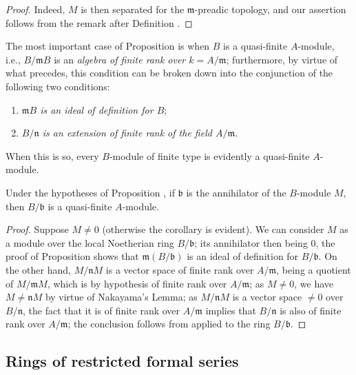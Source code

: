 \begin{proof}
Indeed, $M$ is then separated for the $\mathfrak{m}$-preadic topology, and our assertion
follows from the remark after Definition .
\end{proof}

\begin{env}[7.4.4]
\label{0.7.4.4}
The most important case of Proposition  is when $B$ is a
quasi-finite $A$-module, i.e., $B/\mathfrak{m}B$ is an \emph{algebra of finite rank over
$k=A/\mathfrak{m}$}; furthermore, by virtue of what precedes, this condition can be
broken down into the conjunction of the following two conditions:
\begin{enumerate}
  \item[(i)] \emph{$\mathfrak{m}B$ is an ideal of definition for $B$};
  \item[(ii)] \emph{$B/\mathfrak{n}$ is an extension of finite rank of the field $A/\mathfrak{m}$}.
\end{enumerate}
When this is so, every $B$-module of finite type is evidently a quasi-finite $A$-module.
\end{env}

\begin{corollary}[7.4.5]
\label{0.7.4.5}
Under the hypotheses of Proposition , if
$\mathfrak{b}$ is the annihilator of the $B$-module $M$, then $B/\mathfrak{b}$ is a
quasi-finite $A$-module.
\end{corollary}

\begin{proof}
Suppose $M\neq 0$ (otherwise the corollary is evident). We can consider $M$ as a
module over the local Noetherian ring $B/\mathfrak{b}$; its annihilator then being
$0$, the proof of Proposition  shows that
$\mathfrak{m}(B/\mathfrak{b})$ is an ideal of definition for $B/\mathfrak{b}$.
On the other hand, $M/\mathfrak{n}M$ is a vector space of finite rank over
$A/\mathfrak{m}$, being a quotient of $M/\mathfrak{m}M$, which is by hypothesis of
finite rank over $A/\mathfrak{m}$; as $M\neq 0$, we have $M\neq\mathfrak{n}M$ by
virtue of Nakayama's Lemma; as $M/\mathfrak{n}M$ is a vector space $\neq 0$ over
$B/\mathfrak{n}$, the fact that it is of finite rank over $A/\mathfrak{m}$ implies
that $B/\mathfrak{n}$ is also of finite rank over $A/\mathfrak{m}$; the conclusion
follows from  applied to the ring $B/\mathfrak{b}$.
\end{proof}

\subsection{Rings of restricted formal series}
\label{subsection:0.7.5}

